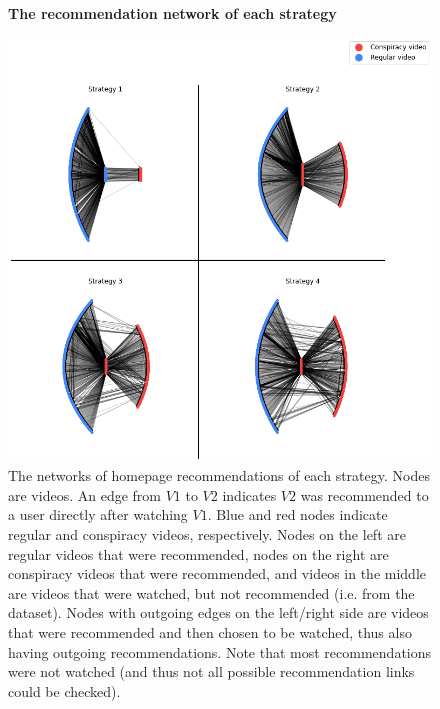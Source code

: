 \documentclass[../main.tex]{subfiles}
\begin{document}
\begin{figure}
  \textbf{The recommendation network of each strategy}\par\medskip
  \centering
  \includegraphics[keepaspectratio, width=\textwidth]{images/recommendation networks.png}
  \caption{The networks of homepage recommendations of each strategy. Nodes are videos. An edge from $V1$ to $V2$ indicates $V2$ was recommended to a user directly after watching $V1$. Blue and red nodes indicate regular and conspiracy videos, respectively. Nodes on the left are regular videos that were recommended, nodes on the right are conspiracy videos that were recommended, and videos in the middle are videos that were watched, but not recommended (i.e. from the dataset). Nodes with outgoing edges on the left/right side are videos that were recommended and then chosen to be watched, thus also having outgoing recommendations. Note that most recommendations were not watched (and thus not all possible recommendation links could be checked).}
  \label{fig:rec_net}
\end{figure}

\newpage
\end{document}
